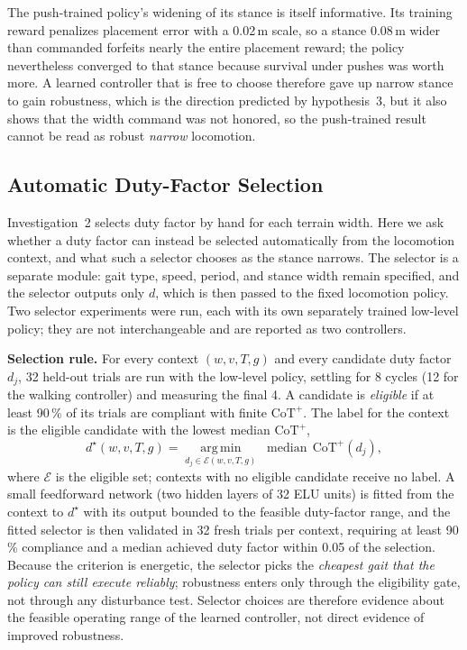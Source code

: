 The push-trained policy's widening of its stance is itself informative. Its
training reward penalizes placement error with a 0.02\,m scale, so a stance
0.08\,m wider than commanded forfeits nearly the entire placement reward;
the policy nevertheless converged to that stance because survival under pushes
was worth more. A learned controller that is free to choose therefore gave up
narrow stance to gain robustness, which is the direction predicted by
hypothesis~3, but it also shows that the width command was not honored, so the
push-trained result cannot be read as robust \emph{narrow} locomotion.

\subsection{Automatic Duty-Factor Selection}
\label{sec:inv3_selector}

Investigation~2 selects duty factor by hand for each terrain width. Here we
ask whether a duty factor can instead be selected automatically from the
locomotion context, and what such a selector chooses as the stance narrows.
The selector is a separate module: gait type, speed, period, and stance width
remain specified, and the selector outputs only $d$, which is then passed to
the fixed locomotion policy. Two selector experiments were run, each with its
own separately trained low-level policy; they are not interchangeable and are
reported as two controllers.

\textbf{Selection rule.} For every context
$(w, v, T, g)$ and every candidate duty factor $d_j$, 32 held-out trials are
run with the low-level policy, settling for 8 cycles (12 for the walking
controller) and measuring the final 4. A candidate is \emph{eligible} if at
least 90\,\% of its trials are compliant with finite $\mathrm{CoT}^{+}$. The
label for the context is the eligible candidate with the lowest median
$\mathrm{CoT}^{+}$,
\begin{equation}
d^{\star}(w,v,T,g) = \operatorname*{arg\,min}_{d_j \in \mathcal{E}(w,v,T,g)}\;
\operatorname{median}\,\mathrm{CoT}^{+}(d_j),
\label{eq:inv3_selector}
\end{equation}
where $\mathcal{E}$ is the eligible set; contexts with no eligible candidate
receive no label. A small feedforward network (two hidden layers of 32 ELU
units) is fitted from the context to $d^\star$ with its output bounded to the
feasible duty-factor range, and the fitted selector is then validated in 32
fresh trials per context, requiring at least 90\,\% compliance and a median
achieved duty factor within 0.05 of the selection. Because the criterion is
energetic, the selector picks the \emph{cheapest gait that the policy can
still execute reliably}; robustness enters only through the eligibility gate,
not through any disturbance test. Selector choices are therefore evidence
about the feasible operating range of the learned controller, not direct
evidence of improved robustness.

